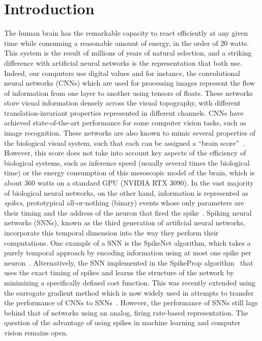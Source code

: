 \documentclass[default]{sn-jnl}%
\theoremstyle{thmstyleone}%
\theoremstyle{thmstyletwo}%
\theoremstyle{thmstylethree}%
\begin{document}
\section{Introduction}
\label{sec:intro}
%
The human brain has the remarkable capacity to react efficiently at any given time while consuming a reasonable amount of energy, in the order of $20$ watts. This system is the result of millions of years of natural selection, and a striking difference with artificial neural networks is the representation that both use. Indeed, our computers use digital values and for instance, the convolutional neural networks (CNNs) which are used for processing images represent the flow of information from one layer to another using tensors of floats. These networks store visual information densely across the visual topography, with different translation-invariant properties represented in different channels. CNNs have achieved state-of-the-art performance for some computer vision tasks, such as image recognition. These networks are also known to mimic several properties of the biological visual system, such that each can be assigned a ``brain score''~\citep{schrimpf_brain-score_2020}. However, this score does not take into account key aspects of the efficiency of biological systems, such as inference speed (usually several times the biological time) or the energy consumption of this mesoscopic model of the brain, which is about $360$ watts on a standard GPU (NVIDIA RTX 3090). In the vast majority of biological neural networks, on the other hand, information is represented as \emph{spikes}, prototypical all-or-nothing (binary) events whose only parameters are their timing and the address of the neuron that fired the spike~\citep{paugam-moisy_computing_2012}. Spiking neural networks (SNNs), known as the third generation of artificial neural networks, incorporate this temporal dimension into the way they perform their computations. One example of a SNN is the SpikeNet algorithm, which takes a purely temporal approach by encoding information using at most one spike per neuron~\citep{delorme_spikenet_1999}. Alternatively, the SNN implemented in the SpikeProp algorithm~\citep{bohte_error-backpropagation_2002} that uses the exact timing of spikes and learns the structure of the network by minimizing a specifically defined cost function. This was recently extended using the surrogate gradient method which is now widely used in attempts to transfer the performance of CNNs to SNNs~\citep{zenke_remarkable_2021}. However, the performance of SNNs still lags behind that of networks using an analog, firing rate-based representation. The question of the advantage of using spikes in machine learning and computer vision remains open.
\end{document}
